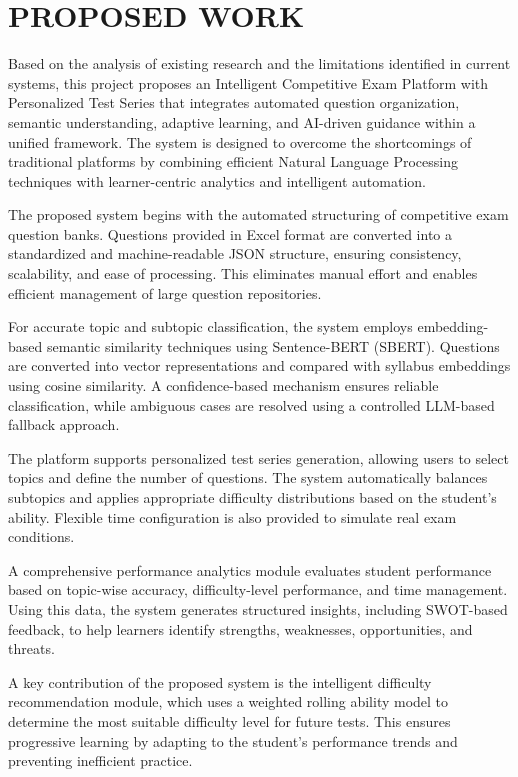 \begin{sloppypar}
\section{\MakeUppercase{PROPOSED WORK}}

Based on the analysis of existing research and the limitations identified in current systems, this project proposes an Intelligent Competitive Exam Platform with Personalized Test Series that integrates automated question organization, semantic understanding, adaptive learning, and AI-driven guidance within a unified framework. The system is designed to overcome the shortcomings of traditional platforms by combining efficient Natural Language Processing techniques with learner-centric analytics and intelligent automation.

The proposed system begins with the automated structuring of competitive exam question banks. Questions provided in Excel format are converted into a standardized and machine-readable JSON structure, ensuring consistency, scalability, and ease of processing. This eliminates manual effort and enables efficient management of large question repositories.

For accurate topic and subtopic classification, the system employs embedding-based semantic similarity techniques using Sentence-BERT (SBERT). Questions are converted into vector representations and compared with syllabus embeddings using cosine similarity. A confidence-based mechanism ensures reliable classification, while ambiguous cases are resolved using a controlled LLM-based fallback approach.

The platform supports personalized test series generation, allowing users to select topics and define the number of questions. The system automatically balances subtopics and applies appropriate difficulty distributions based on the student's ability. Flexible time configuration is also provided to simulate real exam conditions.

A comprehensive performance analytics module evaluates student performance based on topic-wise accuracy, difficulty-level performance, and time management. Using this data, the system generates structured insights, including SWOT-based feedback, to help learners identify strengths, weaknesses, opportunities, and threats.

A key contribution of the proposed system is the intelligent difficulty recommendation module, which uses a weighted rolling ability model to determine the most suitable difficulty level for future tests. This ensures progressive learning by adapting to the student's performance trends and preventing inefficient practice.


\end{sloppypar}
